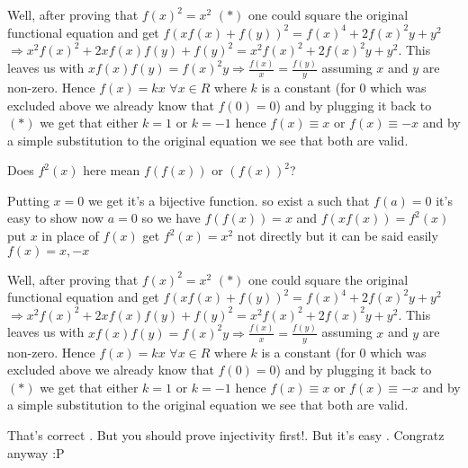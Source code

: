 \begin{solution}
	Well, after proving that $f(x)^2=x^2$  $(*)$ one could square the original functional equation and get
$f(xf(x)+f(y))^2=f(x)^4+2f(x)^2y+y^2$
$\Rightarrow x^2f(x)^2+2xf(x)f(y)+f(y)^2=x^2f(x)^2+2f(x)^2y+y^2$.
This leaves us with $xf(x)f(y)=f(x)^2y \Rightarrow \frac{f(x)}{x}=\frac{f(y)}{y}$ assuming $x$ and $y$ are non-zero.
Hence $f(x)=kx$  $\forall x\in R$ where $k$ is a constant (for $0$ which was excluded above we already know that $f(0)=0$) and by plugging it back to $(*)$ we get that either $k=1$ or $k=-1$ hence $f(x)\equiv x$ or $f(x)\equiv -x$ and by a simple substitution to the original equation we see that both are valid.
\end{solution}



\begin{solution}
	Does $f^2(x)$ here mean $f(f(x))$ or $(f(x))^2$?
\end{solution}



\begin{solution}
	Putting $x=0$ we get it's a bijective function. so exist a such that $f(a)=0$
it's easy to show now $a=0$
so we have $f(f(x))=x$ and $f(xf(x))=f^2(x)$
put $x$ in place of $f(x)$ get $f^2(x)=x^2$
not directly but it can be said easily $f(x)=x ,-x$
\end{solution}



\begin{solution}
	\begin{tcolorbox}Well, after proving that $f(x)^2=x^2$  $(*)$ one could square the original functional equation and get
$f(xf(x)+f(y))^2=f(x)^4+2f(x)^2y+y^2$
$\Rightarrow x^2f(x)^2+2xf(x)f(y)+f(y)^2=x^2f(x)^2+2f(x)^2y+y^2$.
This leaves us with $xf(x)f(y)=f(x)^2y \Rightarrow \frac{f(x)}{x}=\frac{f(y)}{y}$ assuming $x$ and $y$ are non-zero.
Hence $f(x)=kx$  $\forall x\in R$ where $k$ is a constant (for $0$ which was excluded above we already know that $f(0)=0$) and by plugging it back to $(*)$ we get that either $k=1$ or $k=-1$ hence $f(x)\equiv x$ or $f(x)\equiv -x$ and by a simple substitution to the original equation we see that both are valid.\end{tcolorbox}

That's correct . But you should prove injectivity first!. But it's easy . Congratz anyway :P
\end{solution}




